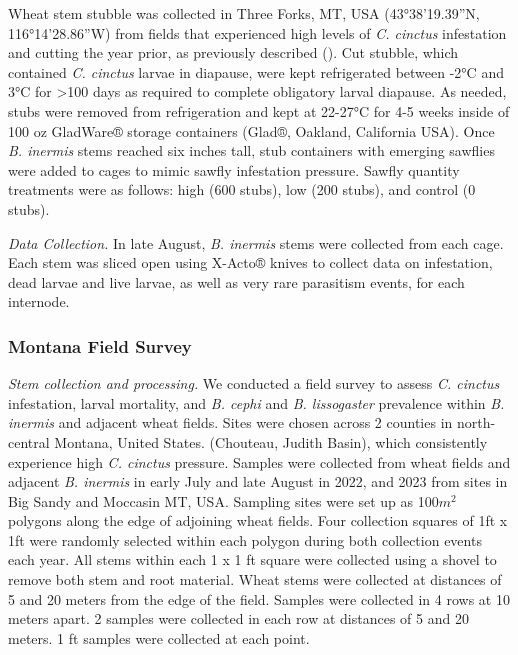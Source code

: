 \documentclass[
]{article}
\begin{document}
Wheat stem stubble was collected in Three Forks, MT, USA
(43°38'19.39''N, 116°14'28.86''W) from fields that experienced high
levels of \emph{C. cinctus} infestation and cutting the year prior, as
previously described (). Cut
stubble, which contained \emph{C. cinctus} larvae in diapause, were kept
refrigerated between -2°C and 3°C for \textgreater100 days as required
to complete obligatory larval diapause. As needed, stubs were removed
from refrigeration and kept at 22-27°C for 4-5 weeks inside of 100 oz
GladWare® storage containers (Glad®, Oakland, California USA). Once
\emph{B. inermis} stems reached six inches tall, stub containers with
emerging sawflies were added to cages to mimic sawfly infestation
pressure. Sawfly quantity treatments were as follows: high (600 stubs),
low (200 stubs), and control (0 stubs).

\emph{Data Collection.} In late August, \emph{B. inermis} stems were
collected from each cage. Each stem was sliced open using X-Acto® knives
to collect data on infestation, dead larvae and live larvae, as well as
very rare parasitism events, for each internode.

\subsubsection{Montana Field Survey}\label{montana-field-survey}

\emph{Stem collection and processing.} We conducted a field survey to
assess \emph{C. cinctus} infestation, larval mortality, and \emph{B.
cephi} and \emph{B. lissogaster} prevalence within \emph{B. inermis} and
adjacent wheat fields. Sites were chosen across 2 counties in
north-central Montana, United States. (Chouteau, Judith Basin), which
consistently experience high \emph{C. cinctus} pressure. Samples were
collected from wheat fields and adjacent \emph{B. inermis} in early July
and late August in 2022, and 2023 from sites in Big Sandy and Moccasin
MT, USA. Sampling sites were set up as 100\(m^2\) polygons along the
edge of adjoining wheat fields. Four collection squares of 1ft x 1ft
were randomly selected within each polygon during both collection events
each year. All stems within each 1 x 1 ft square were collected using a
shovel to remove both stem and root material. Wheat stems were collected
at distances of 5 and 20 meters from the edge of the field. Samples were
collected in 4 rows at 10 meters apart. 2 samples were collected in each
row at distances of 5 and 20 meters. 1 ft samples were collected at each
point.
\end{document}
